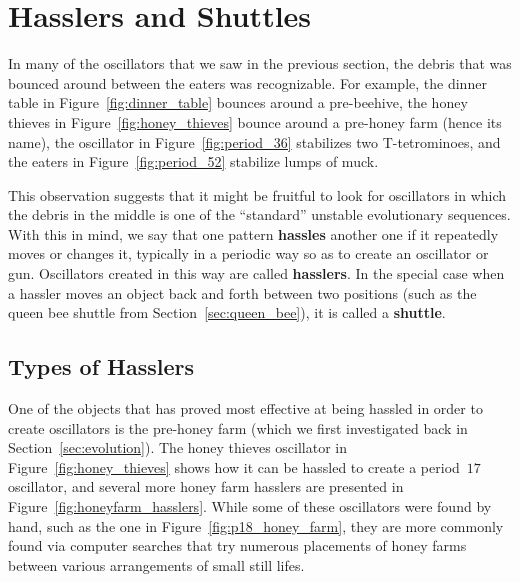 \section{Hasslers and Shuttles}\label{sec:hasslers}

In many of the oscillators that we saw in the previous section, the debris that was bounced around between the eaters was recognizable. For example, the dinner table in Figure~\ref{fig:dinner_table} bounces around a pre-beehive, the honey thieves in Figure~\ref{fig:honey_thieves} bounce around a pre-honey farm (hence its name), the oscillator in Figure~\ref{fig:period_36} stabilizes two T-tetrominoes, and the eaters in Figure~\ref{fig:period_52} stabilize lumps of muck.

This observation suggests that it might be fruitful to look for oscillators in which the debris in the middle is one of the ``standard'' unstable evolutionary sequences. With this in mind, we say that one pattern \textbf{hassles} another one if it repeatedly moves or changes it, typically in a periodic way so as to create an oscillator or gun. Oscillators created in this way are called \textbf{hasslers}. In the special case when a hassler moves an object back and forth between two positions (such as the queen bee shuttle from Section~\ref{sec:queen_bee}), it is called a \textbf{shuttle}.



\subsection{Types of Hasslers}\label{sec:hassler_types}

One of the objects that has proved most effective at being hassled in order to create oscillators is the pre-honey farm (which we first investigated back in Section~\ref{sec:evolution}). The honey thieves oscillator in Figure~\ref{fig:honey_thieves} shows how it can be hassled to create a period~$17$ oscillator, and several more honey farm hasslers are presented in Figure~\ref{fig:honeyfarm_hasslers}. While some of these oscillators were found by hand, such as the one in Figure~\ref{fig:p18_honey_farm}, they are more commonly found via computer searches that try numerous placements of honey farms between various arrangements of small still lifes.

